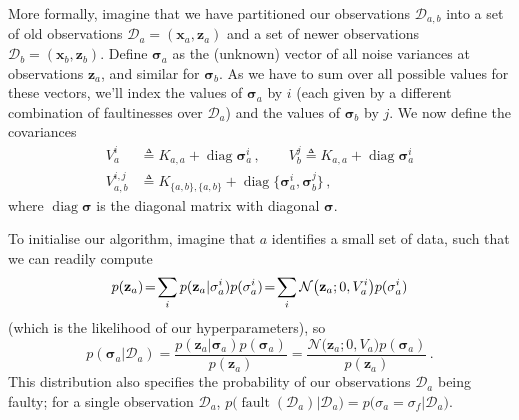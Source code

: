 \documentclass{article}
\newcommand{\cm}[1]{\ensuremath{\mathcal{#1}}}
\newcommand{\bm}[1]{\ensuremath{\mathbf{#1}}}
\newcommand{\data}{\ensuremath{\cm{D}}}
\newcommand{\vect}[1]{\bm{#1}}
\newcommand{\vz}{\vect{z}}
\newcommand{\vx}{\vect{x}}
\newcommand{\vs}{\vect{\sigma}}
\newcommand{\fPr}{p}
\newcommand{\Prob}[2]{\fPr\bigl(#1\big\vert#2\bigr)}
\newcommand{\ps}[2]{p(#1\vert#2)}
\newcommand{\N}[3]{\cm{N}\bigl(#1;#2,#3\bigr)}
\newcommand{\defequal}{\triangleq}
\DeclareMathOperator{\fault}{fault}
\DeclareMathOperator{\diag}{diag}
\begin{document}
More formally, imagine that we have partitioned our observations $\data_{a,b}$ into a set of old observations $\data_a=(\vx_a,\vz_a)$ and a set of newer observations $\data_b = (\vx_b,\vz_b)$. Define $\vs_{a}$ as the (unknown) vector of all noise variances at observations $\vz_{a}$, and similar for $\vs_{b}$. As we have to sum over all possible values for these vectors, we'll index the values of $\vs_{a}$ by $i$ (each given by a different combination of faultinesses over $\data_a$) and the values of $\vs_{b}$ by $j$. We now define the covariances
\begin{align*}
 V_a^i & \defequal K_{a,a} + \diag \vs_{a}^i\,, \qquad
 V_b^j \defequal K_{a,a} + \diag \vs_{a}^i \\
 V_{a,b}^{i,j} & \defequal K_{\{a,b\},\{a,b\}} + \diag \{\vs_{a}^i,\vs_{b}^j\}\,,
\end{align*}
where $\diag \vs$ is the diagonal matrix with diagonal $\vs$. 

To initialise our algorithm, imagine that $a$ identifies a small set of data, such that we can readily compute
\begin{equation}
 \hspace{-0.0cm}p(\vz_a)\!=\!\sum_i  \ps{\vz_a}{\vs^i_a}\fPr(\vs^i_a)
\!=\! \sum_i \N{\vz_a}{0}{V_a^i}\fPr(\vs_a^i) \label{eq:likelihood_a}
\end{equation}
(which is the likelihood of our hyperparameters), so
\begin{equation}
\ps{\vs_a}{\data_{a}} 
= \frac{\ps{\vz_a}{\vs_a}\fPr(\vs_a)}{p(\vz_a)} 
= \frac{\N{\vz_a}{0}{V_a} \fPr(\vs_a)}{p(\vz_a)}\label{eq:psa}\,.
\end{equation}
This distribution also specifies the probability of our observations $\data_a$ being faulty; for a single observation $\data_a$,
$
\Prob{\fault(\data_a)}{\data_{a}} = \Prob{\sigma_a = \sigma_f}{\data_{a}}
$.
\end{document}
